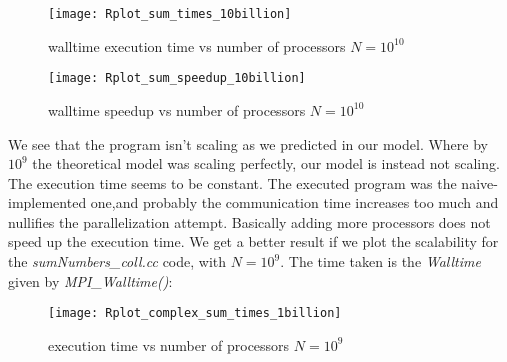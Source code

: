 \documentclass[11pt]{scrartcl} %
\begin{document}
\begin{figure}[H] %
	\centering
	\texttt{[image: Rplot\_sum\_times\_10billion]} %
	\caption{walltime execution time vs number of processors $N= 10^{10}$}
\end{figure}
\begin{figure}[H] %
	\centering
	\texttt{[image: Rplot\_sum\_speedup\_10billion]} %
	\caption{walltime speedup vs number of processors $N= 10^{10}$}
\end{figure}

We see that the program isn't scaling as we predicted in our model.
Where by $10^9$ the theoretical model was scaling perfectly, our model is instead not scaling.
The execution time seems to be constant.
The executed program was the naive-implemented one,and probably the communication time increases too much and nullifies the parallelization attempt.
Basically adding more processors does not speed up the execution time.
We get a better result if we plot the scalability for the \textit{sumNumbers\_coll.cc} code, with $N=10^{9}$. The time taken is the \textit{Walltime} given by \textit{MPI\_Walltime()}:

\begin{figure}[H] %
	\centering
	\texttt{[image: Rplot\_complex\_sum\_times\_1billion]} %
	\caption{execution time vs number of processors $N= 10^9$}
\end{figure}
\end{document}
